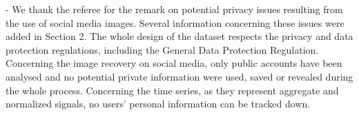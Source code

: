 \documentclass[10pt]{article} %
\begin{document}
- We thank the referee for the remark on potential privacy issues resulting from the use of social media images. Several information concerning these issues were added in Section 2. The whole design of the dataset respects the privacy and data protection regulations, including the General Data Protection Regulation. Concerning the image recovery on social media, only public accounts have been analysed and no potential private information were used, saved or revealed during the whole process. Concerning the time series, as they represent aggregate and normalized signals, no users' personal information can be tracked down.		
\end{document}
